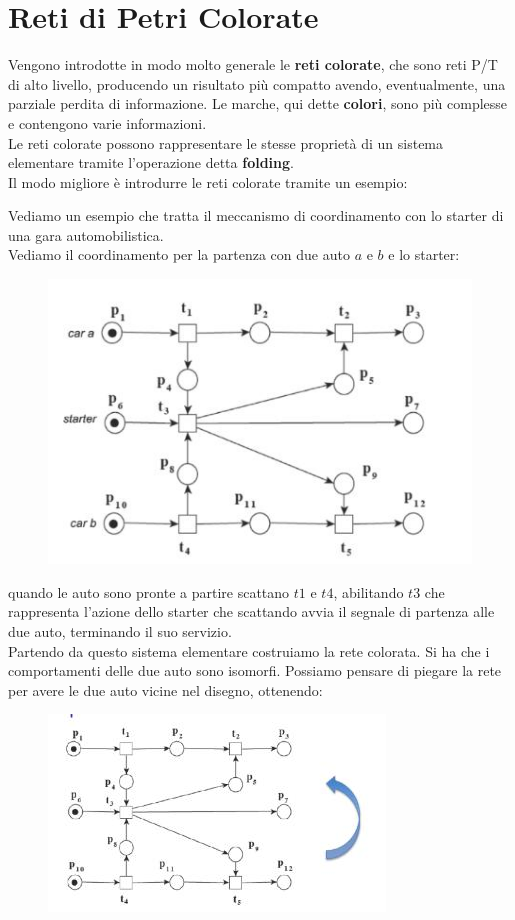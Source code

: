 \documentclass[a4paper,12pt, oneside]{book}
\begin{document}
\section{Reti di Petri Colorate}
Vengono introdotte in modo molto generale le \textbf{reti colorate}, che sono
reti P/T di alto livello, producendo un risultato più compatto avendo,
eventualmente, una parziale perdita di informazione. Le marche, qui
dette \textbf{colori}, sono più complesse e contengono varie informazioni.\\
Le reti colorate possono rappresentare le stesse proprietà di un sistema
elementare tramite l'operazione detta \textbf{folding}.\\
Il modo migliore è introdurre le reti colorate tramite un esempio:
\begin{esempio}
  Vediamo un esempio che tratta il meccanismo di coordinamento con lo starter di
  una gara automobilistica.\\
  Vediamo il coordinamento per la partenza con due auto $a$ e $b$ e lo starter:
  \begin{figure}[H]
    \centering
    \includegraphics[scale = 0.5]{img/c.jpg}
  \end{figure}
  quando le auto sono pronte a partire scattano $t1$ e $t4$, abilitando $t3$ che
  rappresenta l'azione dello starter che scattando avvia il segnale di partenza
  alle due auto, terminando il suo servizio.\\
  Partendo da questo sistema elementare costruiamo la rete colorata. Si ha che i
  comportamenti delle due auto sono isomorfi. Possiamo pensare di piegare la
  rete per avere le due auto vicine nel disegno, ottenendo:
  \begin{figure}[H]
    \centering
    \includegraphics[scale = 0.7]{img/c1.jpg}

\end{figure}
\end{esempio}
\end{document}
